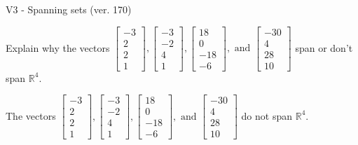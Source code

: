 \begin{exercise}
  \begin{exerciseTitle}V3 - Spanning sets (ver. 170)\end{exerciseTitle}
  \begin{exerciseStatement}
    Explain why the vectors \(\left[\begin{array}{r}
-3 \\
2 \\
2 \\
1
\end{array}\right] , \left[\begin{array}{r}
-3 \\
-2 \\
4 \\
1
\end{array}\right] , \left[\begin{array}{r}
18 \\
0 \\
-18 \\
-6
\end{array}\right] , \text{ and } \left[\begin{array}{r}
-30 \\
4 \\
28 \\
10
\end{array}\right]\) span or don't span \(\mathbb{R}^4\). 
	


  \end{exerciseStatement}
  \begin{exerciseAnswer}
   The vectors \(\left[\begin{array}{r}
-3 \\
2 \\
2 \\
1
\end{array}\right] , \left[\begin{array}{r}
-3 \\
-2 \\
4 \\
1
\end{array}\right] , \left[\begin{array}{r}
18 \\
0 \\
-18 \\
-6
\end{array}\right] , \text{ and } \left[\begin{array}{r}
-30 \\
4 \\
28 \\
10
\end{array}\right]\) 
  	 do not  
	span \(\mathbb{R}^4\).
  


  \end{exerciseAnswer}
\end{exercise}